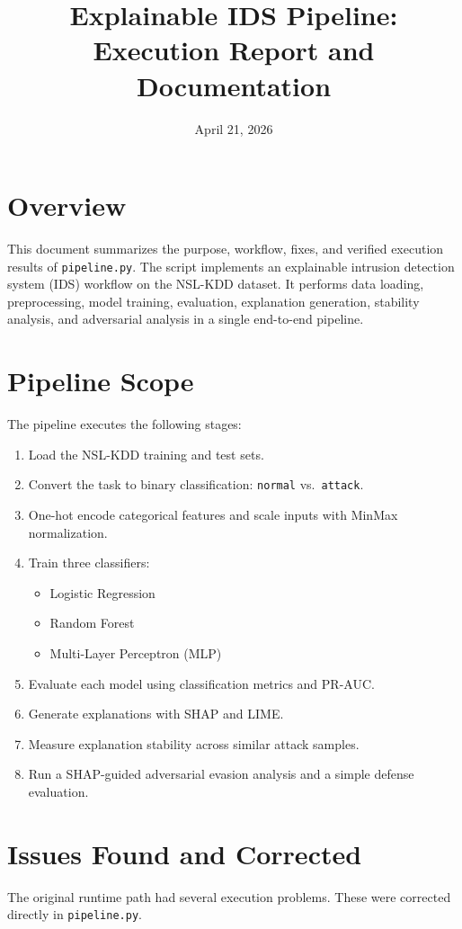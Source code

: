 \documentclass[11pt]{article}
\title{Explainable IDS Pipeline: Execution Report and Documentation}
\author{}
\date{April 21, 2026}
\begin{document}
\maketitle

\section{Overview}
This document summarizes the purpose, workflow, fixes, and verified execution results of \texttt{pipeline.py}. The script implements an explainable intrusion detection system (IDS) workflow on the NSL-KDD dataset. It performs data loading, preprocessing, model training, evaluation, explanation generation, stability analysis, and adversarial analysis in a single end-to-end pipeline.

\section{Pipeline Scope}
The pipeline executes the following stages:
\begin{enumerate}[leftmargin=*]
    \item Load the NSL-KDD training and test sets.
    \item Convert the task to binary classification: \texttt{normal} vs.\ \texttt{attack}.
    \item One-hot encode categorical features and scale inputs with MinMax normalization.
    \item Train three classifiers:
    \begin{itemize}[leftmargin=1.5em]
        \item Logistic Regression
        \item Random Forest
        \item Multi-Layer Perceptron (MLP)
    \end{itemize}
    \item Evaluate each model using classification metrics and PR-AUC.
    \item Generate explanations with SHAP and LIME.
    \item Measure explanation stability across similar attack samples.
    \item Run a SHAP-guided adversarial evasion analysis and a simple defense evaluation.
\end{enumerate}

\section{Issues Found and Corrected}
The original runtime path had several execution problems. These were corrected directly in \texttt{pipeline.py}.
\end{document}
